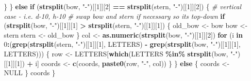 \documentclass[
]{article}
\newenvironment{Shaded}{\begin{snugshade}}{\end{snugshade}}
\newcommand{\CommentTok}[1]{\textcolor[rgb]{0.56,0.35,0.01}{\textit{#1}}}
\newcommand{\ConstantTok}[1]{\textcolor[rgb]{0.56,0.35,0.01}{#1}}
\newcommand{\ControlFlowTok}[1]{\textcolor[rgb]{0.13,0.29,0.53}{\textbf{#1}}}
\newcommand{\DecValTok}[1]{\textcolor[rgb]{0.00,0.00,0.81}{#1}}
\newcommand{\FunctionTok}[1]{\textcolor[rgb]{0.13,0.29,0.53}{\textbf{#1}}}
\newcommand{\NormalTok}[1]{#1}
\newcommand{\OtherTok}[1]{\textcolor[rgb]{0.56,0.35,0.01}{#1}}
\newcommand{\SpecialCharTok}[1]{\textcolor[rgb]{0.81,0.36,0.00}{\textbf{#1}}}
\newcommand{\StringTok}[1]{\textcolor[rgb]{0.31,0.60,0.02}{#1}}
\begin{document}
\begin{Shaded}
\begin{Highlighting}[]
\NormalTok{    \}}
\NormalTok{  \} }\ControlFlowTok{else} \ControlFlowTok{if}\NormalTok{ (}\FunctionTok{strsplit}\NormalTok{(bow, }\StringTok{"{-}"}\NormalTok{)[[}\DecValTok{1}\NormalTok{]][}\DecValTok{2}\NormalTok{] }\SpecialCharTok{==} \FunctionTok{strsplit}\NormalTok{(stern, }\StringTok{"{-}"}\NormalTok{)[[}\DecValTok{1}\NormalTok{]][}\DecValTok{2}\NormalTok{]) \{}
    \CommentTok{\# vertical case {-} i.e. d{-}10, h{-}10}
    \CommentTok{\# swap bow and stern if necessary so it\textquotesingle{}s top{-}down}
    \ControlFlowTok{if}\NormalTok{ (}\FunctionTok{strsplit}\NormalTok{(bow, }\StringTok{"{-}"}\NormalTok{)[[}\DecValTok{1}\NormalTok{]][}\DecValTok{1}\NormalTok{] }\SpecialCharTok{\textgreater{}} \FunctionTok{strsplit}\NormalTok{(stern, }\StringTok{"{-}"}\NormalTok{)[[}\DecValTok{1}\NormalTok{]][}\DecValTok{1}\NormalTok{]) \{}
\NormalTok{      old\_bow }\OtherTok{\textless{}{-}}\NormalTok{ bow}
\NormalTok{      bow }\OtherTok{\textless{}{-}}\NormalTok{ stern}
\NormalTok{      stern }\OtherTok{\textless{}{-}}\NormalTok{ old\_bow}
\NormalTok{    \}}
\NormalTok{    col }\OtherTok{\textless{}{-}} \FunctionTok{as.numeric}\NormalTok{(}\FunctionTok{strsplit}\NormalTok{(bow, }\StringTok{"{-}"}\NormalTok{)[[}\DecValTok{1}\NormalTok{]][}\DecValTok{2}\NormalTok{])}
    \ControlFlowTok{for}\NormalTok{ (i }\ControlFlowTok{in} \DecValTok{0}\SpecialCharTok{:}\NormalTok{(}\FunctionTok{grep}\NormalTok{(}\FunctionTok{strsplit}\NormalTok{(stern, }\StringTok{"{-}"}\NormalTok{)[[}\DecValTok{1}\NormalTok{]][}\DecValTok{1}\NormalTok{], LETTERS) }\SpecialCharTok{{-}} \FunctionTok{grep}\NormalTok{(}\FunctionTok{strsplit}\NormalTok{(bow, }\StringTok{"{-}"}\NormalTok{)[[}\DecValTok{1}\NormalTok{]][}\DecValTok{1}\NormalTok{], LETTERS))) \{}
\NormalTok{      row }\OtherTok{\textless{}{-}}\NormalTok{ LETTERS[}\FunctionTok{which}\NormalTok{(LETTERS }\SpecialCharTok{\%in\%} \FunctionTok{strsplit}\NormalTok{(bow, }\StringTok{"{-}"}\NormalTok{)[[}\DecValTok{1}\NormalTok{]][}\DecValTok{1}\NormalTok{]) }\SpecialCharTok{+}\NormalTok{ i]}
\NormalTok{      coords }\OtherTok{\textless{}{-}} \FunctionTok{c}\NormalTok{(coords, }\FunctionTok{paste0}\NormalTok{(row, }\StringTok{"{-}"}\NormalTok{, col))}
\NormalTok{    \}}
\NormalTok{  \} }\ControlFlowTok{else}\NormalTok{ \{}
\NormalTok{    coords }\OtherTok{\textless{}{-}} \ConstantTok{NULL}
\NormalTok{  \}}
\NormalTok{  coords}
\NormalTok{\}}


\end{Highlighting}
\end{Shaded}
\end{document}
